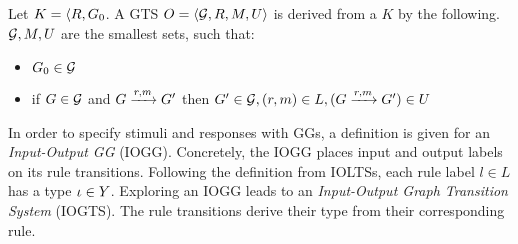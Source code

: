 Let $K = \langle R, G_0$. A GTS $O = \langle \mathcal{G}, R, M, U\rangle$ is derived from a $K$ by the following. $\mathcal{G}, M, U$ are the smallest sets, such that:
\begin{itemize}
\item $G_0 \in \mathcal{G}$
\item if $G \in \mathcal{G}$ and $G \xrightarrow{r, m}G'$ then $G' \in \mathcal{G}, (r, m) \in L, (G \xrightarrow{r, m}G') \in U$
\end{itemize}

\vspace{5px}
\begin{definition}
In order to specify stimuli and responses with GGs, a definition is given for an \textit{Input-Output GG} (IOGG). Concretely, the IOGG places input and output labels on its rule transitions. Following the definition from IOLTSs, each rule label $l \in L$ has a type $\iota \in Y$. Exploring an IOGG leads to an \textit{Input-Output Graph Transition System} (IOGTS). The rule transitions derive their type from their corresponding rule.
\end{definition}
\vspace{5px}
